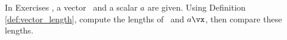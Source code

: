 {\noin In Exercises}
{, a vector \vx\ and a scalar $a$ are given. Using Definition \ref{def:vector_length}, compute the lengths of \vx\ and $a\vx$, then compare these lengths.}
